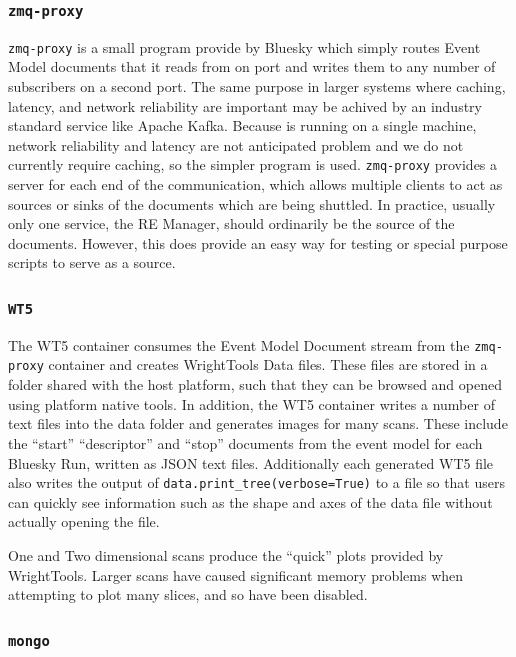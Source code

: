 \subsubsection{\texttt{zmq-proxy}}

\texttt{zmq-proxy} is a small program provide by Bluesky which simply routes Event Model documents that it reads from on port and writes them to any number of subscribers on a second port.
The same purpose in larger systems where caching, latency, and network reliability are important may be achived by an industry standard service like Apache Kafka\cite{kafka}.
Because \biab is running on a single machine, network reliability and latency are not anticipated problem and we do not currently require caching, so the simpler program is used.
\texttt{zmq-proxy} provides a server for each end of the communication, which allows multiple clients to act as sources or sinks of the documents which are being shuttled.
In practice, usually only one service, the RE Manager, should ordinarily be the source of the documents.
However, this does provide an easy way for testing or special purpose scripts to serve as a source.

\subsubsection{\texttt{WT5}}

The WT5 container consumes the Event Model Document stream from the \texttt{zmq-proxy} container and creates WrightTools Data files.
These files are stored in a folder shared with the host platform, such that they can be browsed and opened using platform native tools.
In addition, the WT5 container writes a number of text files into the data folder and generates images for many scans.
These include the ``start'' ``descriptor'' and ``stop'' documents from the event model for each Bluesky Run, written as JSON text files.
Additionally each generated WT5 file also writes the output of \texttt{data.print\_tree(verbose=True)} to a file so that users can quickly see information such as the shape and axes of the data file without actually opening the file.

One and Two dimensional scans produce the ``quick'' plots provided by WrightTools.
Larger scans have caused significant memory problems when attempting to plot many slices, and so have been disabled.

\subsubsection{\texttt{mongo}}

